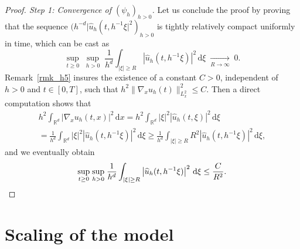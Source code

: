 \documentclass[10pt]{amsart}
\let\hat\oldhat
\theoremstyle{definition}
\let\hat\widehat
\newcommand{\R}{\mathbb{R}}
\newcommand{\ud}{\, {\mathrm{d}}}
\begin{document}
\begin{proof}[Proof. Step 1: Convergence of $(\psi_{h})_{h>0}$]
Let us conclude the proof by proving that the sequence $(h^{-d}|\hat{u}_{h}(t,h^{-1}\xi|^{2})_{h>0}$ is tightly relatively compact uniformly in time, which can be cast as
\[
\underset{t\geq 0}{\sup}\;\underset{h>0}{\sup}\;\frac{1}{h^{d}}\int_{|\xi|\geq R}\left|\hat{u}_{h}(t,h^{-1}\xi)\right|^{2}\ud\xi\;\underset{R\to \infty}{\to}\;0.
\]
Remark~\ref{rmk_h5} insures the existence of a constant $C>0$, independent of $h>0$ and $t\in[0,T]$, such that $h^{2}\|\nabla_{x}u_{h}(t)\|_{L_{x}^{2}}^{2}\leq C$. Then a direct computation shows that
\begin{multline*}
h^{2}\int_{\R^{d}}|\nabla_{x}u_{h}(t,x)|^{2}\ud x=h^{2}\int_{\R^{d}}|\xi|^{2}\left|\hat{u}_{h}(t,\xi)\right|^{2}\ud\xi\\
=\frac{1}{h^{d}}\int_{\R^{d}}|\xi|^{2}\left|\hat{u}_{h}(t,h^{-1}\xi)\right|^{2}\ud\xi\geq\frac{1}{h^{d}}\int_{|\xi|\geq R}R^{2}\left|\hat{u}_{h}(t,h^{-1}\xi)\right|^{2}\ud\xi,
\end{multline*}
and we eventually obtain
\[
\underset{t\geq 0}{\sup}\;\underset{h>0}{\sup}\;\frac{1}{h^{d}}\int_{|\xi|\geq R}\left|\hat{u}_{h}(t,h^{-1}\xi)\right|^{2}\ud\xi\leq \frac{C}{R^{2}}.\qedhere
\]
\end{proof}

\section{Scaling of the model}\label{adim}
\end{document}
